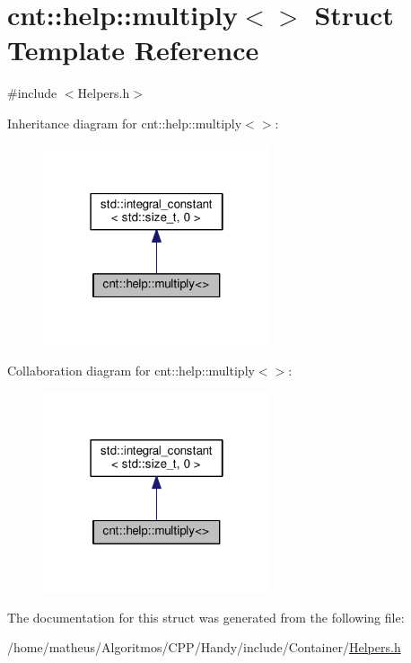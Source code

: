 \hypertarget{structcnt_1_1help_1_1multiply_3_4}{}\section{cnt\+:\+:help\+:\+:multiply$<$$>$ Struct Template Reference}
\label{structcnt_1_1help_1_1multiply_3_4}


{\ttfamily \#include $<$Helpers.\+h$>$}



Inheritance diagram for cnt\+:\+:help\+:\+:multiply$<$$>$\+:\nopagebreak
\begin{figure}[H]
\begin{center}
\leavevmode
\includegraphics[width=190pt]{structcnt_1_1help_1_1multiply_3_4__inherit__graph}
\end{center}
\end{figure}


Collaboration diagram for cnt\+:\+:help\+:\+:multiply$<$$>$\+:\nopagebreak
\begin{figure}[H]
\begin{center}
\leavevmode
\includegraphics[width=190pt]{structcnt_1_1help_1_1multiply_3_4__coll__graph}
\end{center}
\end{figure}


The documentation for this struct was generated from the following file\+:\begin{DoxyCompactItemize}
\item 
/home/matheus/\+Algoritmos/\+C\+P\+P/\+Handy/include/\+Container/\hyperlink{Container_2Helpers_8h}{Helpers.\+h}\end{DoxyCompactItemize}
